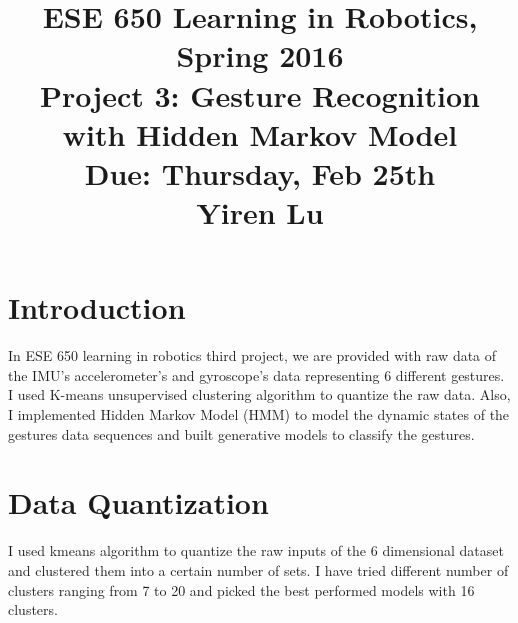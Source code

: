\documentclass[english]{article}
\title{ESE 650 Learning in Robotics, Spring 2016 \\ Project 3: Gesture Recognition with Hidden Markov Model\\
Due: Thursday, Feb 25th \\ Yiren Lu}
\date{}
\begin{document}
\maketitle
\vspace{-30pt}

\section*{Introduction}
In ESE 650 learning in robotics third project, we are provided with raw data of the IMU's accelerometer's and gyroscope's data representing 6 different gestures. I used K-means unsupervised clustering algorithm to quantize the raw data. Also, I implemented Hidden Markov Model (HMM) to model the dynamic states of the gestures data sequences and built generative models to classify the gestures.


\section {Data Quantization}
I used kmeans algorithm to quantize the raw inputs of the 6 dimensional dataset and clustered them into a certain number of sets. I have tried different number of clusters ranging from 7 to 20 and picked the best performed models with 16 clusters. 
\end{document}
